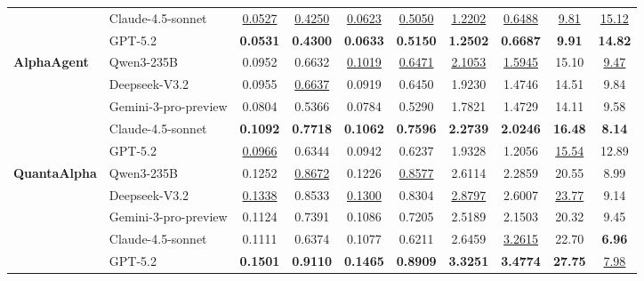 \begin{table}[h]
\begin{tabular}{llcccccccc}
& Claude-4.5-sonnet 
& \underline{0.0527} 
& \underline{0.4250} 
& \underline{0.0623} 
& \underline{0.5050} 
& \underline{1.2202} 
& \underline{0.6488} 
& \underline{9.81} 
& \underline{15.12} \\

& GPT-5.2 
& \textbf{0.0531} 
& \textbf{0.4300} 
& \textbf{0.0633} 
& \textbf{0.5150} 
& \textbf{1.2502} 
& \textbf{0.6687} 
& \textbf{9.91} 
& \textbf{14.82} \\
\midrule
\multirow{5}{*}{\textbf{AlphaAgent}}
& Qwen3-235B 
& 0.0952 
& 0.6632 
& \underline{0.1019} 
& \underline{0.6471} 
& \underline{2.1053} 
& \underline{1.5945} 
& 15.10 
& \underline{9.47} \\

& Deepseek-V3.2 
& 0.0955 
& \underline{0.6637} 
& 0.0919 
& 0.6450 
& 1.9230 
& 1.4746 
& 14.51 
& 9.84 \\

& Gemini-3-pro-preview 
& 0.0804 
& 0.5366 
& 0.0784 
& 0.5290 
& 1.7821 
& 1.4729 
& 14.11 
& 9.58 \\

& Claude-4.5-sonnet 
& \textbf{0.1092} 
& \textbf{0.7718} 
& \textbf{0.1062} 
& \textbf{0.7596} 
& \textbf{2.2739} 
& \textbf{2.0246} 
& \textbf{16.48} 
& \textbf{8.14} \\

& GPT-5.2 
& \underline{0.0966} 
& 0.6344 
& 0.0942 
& 0.6237 
& 1.9328 
& 1.2056 
& \underline{15.54} 
& 12.89 \\

\midrule
\multirow{5}{*}{\colorbox[RGB]{245, 235, 235}{\textbf{QuantaAlpha}}}
& Qwen3-235B 
& 0.1252 
& \underline{0.8672} 
& 0.1226 
& \underline{0.8577}
& 2.6114 
& 2.2859 
& 20.55 
& 8.99 \\

& Deepseek-V3.2 
& \underline{0.1338} 
& 0.8533 
& \underline{0.1300} 
& 0.8304
& \underline{2.8797} 
& 2.6007 
& \underline{23.77} 
& 9.14 \\





& Gemini-3-pro-preview 
& 0.1124 
& 0.7391 
& 0.1086 
& 0.7205 
& 2.5189 
& 2.1503 
& 20.32 
& 9.45 \\

& Claude-4.5-sonnet 
& 0.1111 
& 0.6374 
& 0.1077 
& 0.6211 
& 2.6459 
& \underline{3.2615} 
& 22.70 
& \colorbox[RGB]{236,244,252}{\textbf{6.96}} \\

& GPT-5.2 
& \colorbox[RGB]{236,244,252}{\textbf{0.1501}}
& \colorbox[RGB]{236,244,252}{\textbf{0.9110}}
& \colorbox[RGB]{236,244,252}{\textbf{0.1465}} 
& \colorbox[RGB]{236,244,252}{\textbf{0.8909}}
& \colorbox[RGB]{236,244,252}{\textbf{3.3251}}
& \colorbox[RGB]{236,244,252}{\textbf{3.4774}}
& \colorbox[RGB]{236,244,252}{\textbf{27.75}}
& \underline{7.98} \\


\bottomrule[1.5pt]
\end{tabular}
\end{table}
